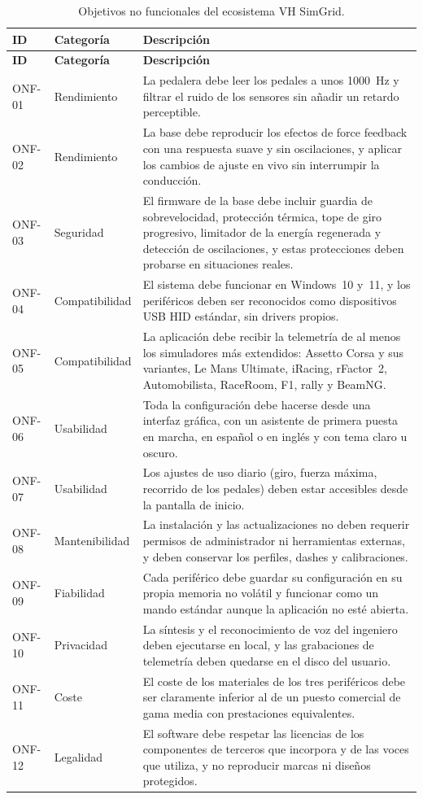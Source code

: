 {\small
\begin{longtable}{@{}l>{\raggedright\arraybackslash}p{2.9cm}p{\dimexpr\textwidth-5.3cm\relax}@{}}
	\caption{Objetivos no funcionales del ecosistema VH SimGrid.}
	\label{tab:onf} \\
	\toprule
	\textbf{ID} & \textbf{Categoría} & \textbf{Descripción} \\
	\midrule
	\endfirsthead
	\toprule
	\textbf{ID} & \textbf{Categoría} & \textbf{Descripción} \\
	\midrule
	\endhead
		ONF-01 & Rendimiento &
		La pedalera debe leer los pedales a unos 1000~Hz y filtrar el ruido de los sensores sin añadir un retardo perceptible. \\
		ONF-02 & Rendimiento &
		La base debe reproducir los efectos de force feedback con una respuesta suave y sin oscilaciones, y aplicar los cambios de ajuste en vivo sin interrumpir la conducción. \\
		ONF-03 & Seguridad &
		El firmware de la base debe incluir guardia de sobrevelocidad, protección térmica, tope de giro progresivo, limitador de la energía regenerada y detección de oscilaciones, y estas protecciones deben probarse en situaciones reales. \\
		ONF-04 & Compatibilidad &
		El sistema debe funcionar en Windows~10 y~11, y los periféricos deben ser reconocidos como dispositivos USB HID estándar, sin drivers propios. \\
		ONF-05 & Compatibilidad &
		La aplicación debe recibir la telemetría de al menos los simuladores más extendidos: Assetto Corsa y sus variantes, Le Mans Ultimate, iRacing, rFactor~2, Automobilista, RaceRoom, F1, rally y BeamNG. \\
		ONF-06 & Usabilidad &
		Toda la configuración debe hacerse desde una interfaz gráfica, con un asistente de primera puesta en marcha, en español o en inglés y con tema claro u oscuro. \\
		ONF-07 & Usabilidad &
		Los ajustes de uso diario (giro, fuerza máxima, recorrido de los pedales) deben estar accesibles desde la pantalla de inicio. \\
		ONF-08 & Mantenibilidad &
		La instalación y las actualizaciones no deben requerir permisos de administrador ni herramientas externas, y deben conservar los perfiles, dashes y calibraciones. \\
		ONF-09 & Fiabilidad &
		Cada periférico debe guardar su configuración en su propia memoria no volátil y funcionar como un mando estándar aunque la aplicación no esté abierta. \\
		ONF-10 & Privacidad &
		La síntesis y el reconocimiento de voz del ingeniero deben ejecutarse en local, y las grabaciones de telemetría deben quedarse en el disco del usuario. \\
		ONF-11 & Coste &
		El coste de los materiales de los tres periféricos debe ser claramente inferior al de un puesto comercial de gama media con prestaciones equivalentes. \\
		ONF-12 & Legalidad &
		El software debe respetar las licencias de los componentes de terceros que incorpora y de las voces que utiliza, y no reproducir marcas ni diseños protegidos. \\
		\bottomrule
\end{longtable}}
